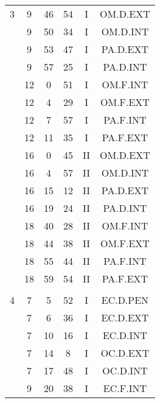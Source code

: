 \documentclass[12pt, a4paper]{article}
\begin{document}
\begin{multicols}{3}
{\begin{tabular}{c c c c c c}
	 	 	 	3 & 9 & 46 & 54 & I & OM.D.EXT\\%
	 	 	 	 & 9 & 50 & 34 & I & OM.D.INT\\%
	 	 	 	 & 9 & 53 & 47 & I & PA.D.EXT\\%
	 	 	 	 & 9 & 57 & 25 & I & PA.D.INT\\%
	 	 	 	 & 12 & 0 & 51 & I & OM.F.INT\\%
	 	 	 	 & 12 & 4 & 29 & I & OM.F.EXT\\%
	 	 	 	 & 12 & 7 & 57 & I & PA.F.INT\\%
	 	 	 	 & 12 & 11 & 35 & I & PA.F.EXT\\%
	 	 	 	 & 16 & 0 & 45 & II & OM.D.EXT\\%
	 	 	 	 & 16 & 4 & 57 & II & OM.D.INT\\%
	 	 	 	 & 16 & 15 & 12 & II & PA.D.EXT\\%
	 	 	 	 & 16 & 19 & 24 & II & PA.D.INT\\%
	 	 	 	 & 18 & 40 & 28 & II & OM.F.INT\\%
	 	 	 	 & 18 & 44 & 38 & II & OM.F.EXT\\%
	 	 	 	 & 18 & 55 & 44 & II & PA.F.INT\\%
	 	 	 	 & 18 & 59 & 54 & II & PA.F.EXT\\%
	 	 	 	 & & & & & \\%
	 	 	 	4 & 7 & 5 & 52 & I & EC.D.PEN\\%
	 	 	 	 & 7 & 6 & 36 & I & EC.D.EXT\\%
	 	 	 	 & 7 & 10 & 16 & I & EC.D.INT\\%
	 	 	 	 & 7 & 14 & 8 & I & OC.D.EXT\\%
	 	 	 	 & 7 & 17 & 48 & I & OC.D.INT\\%
	 	 	 	 & 9 & 20 & 38 & I & EC.F.INT\\%

\end{tabular}}
\end{multicols}
\end{document}
